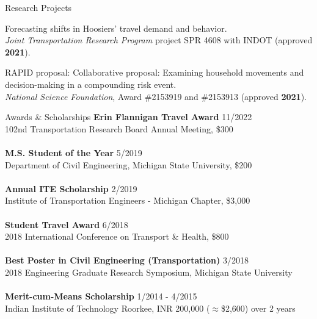 \documentclass{CV} %
\begin{document}
\begin{rSection}{Research Projects}
\begin{etaremune}
        \item Forecasting shifts in Hoosiers' travel demand and behavior.
        \\ \textit{Joint Transportation Research Program} project SPR 4608 with INDOT (approved \textbf{2021}).

        \item RAPID proposal: Collaborative proposal: Examining household movements and decision-making in a compounding risk event.
        \\ \textit{National Science Foundation}, Award \#2153919 and \#2153913 (approved \textbf{2021}).
    \end{etaremune}
\end{rSection}

\begin{rSection}{Awards \& Scholarships}%
    \textbf{Erin Flannigan Travel Award} \hfill {11/2022}
    \\ 102nd Transportation Research Board Annual Meeting, \$300 \\
    \\ \textbf{M.S. Student of the Year} \hfill {5/2019}
    \\ Department of Civil Engineering, Michigan State University, \$200 \\
    \\ \textbf{Annual ITE Scholarship} \hfill {2/2019}
    \\ Institute of Transportation Engineers - Michigan Chapter, \$3,000 \\
    \\ \textbf{Student Travel Award} \hfill {6/2018}
    \\ 2018 International Conference on Transport \& Health, \$800 \\
    \\ \textbf{Best Poster in Civil Engineering (Transportation)} \hfill{3/2018}
    \\ 2018 Engineering Graduate Research Symposium, Michigan State University \\
    \\ \textbf{Merit-cum-Means Scholarship} \hfill{1/2014 - 4/2015}
    \\ Indian Institute of Technology Roorkee, INR 200,000 ($\approx$\$2,600) over 2 years
\end{rSection}
\end{document}
